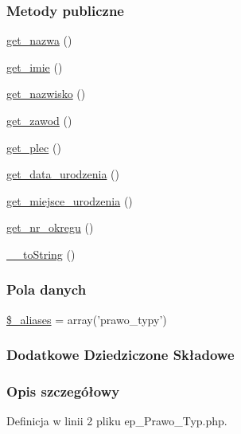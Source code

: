 \subsubsection*{Metody publiczne}
\begin{DoxyCompactItemize}
\item 
\hyperlink{classep___prawo___typ_ac0818f0049d7b84f08f77128f54cee36}{get\-\_\-nazwa} ()
\item 
\hyperlink{classep___prawo___typ_ac4b0c85dc2a130038f2d118dbd0c3d77}{get\-\_\-imie} ()
\item 
\hyperlink{classep___prawo___typ_abdd1d7ff92508da7f748ba1feec97af0}{get\-\_\-nazwisko} ()
\item 
\hyperlink{classep___prawo___typ_af80ca8310b60004454dd02a387deaa2c}{get\-\_\-zawod} ()
\item 
\hyperlink{classep___prawo___typ_ac7f9af5c3fa024e4c26a7b6bd4ce4bb4}{get\-\_\-plec} ()
\item 
\hyperlink{classep___prawo___typ_a880b240cd2d8c336fd1709bf0cb1ae2c}{get\-\_\-data\-\_\-urodzenia} ()
\item 
\hyperlink{classep___prawo___typ_ac57c08ec5e394a19c5bd9280c8376182}{get\-\_\-miejsce\-\_\-urodzenia} ()
\item 
\hyperlink{classep___prawo___typ_a2645a9f0aa5b0ccc482943348c033d0a}{get\-\_\-nr\-\_\-okregu} ()
\item 
\hyperlink{classep___prawo___typ_a7516ca30af0db3cdbf9a7739b48ce91d}{\-\_\-\-\_\-to\-String} ()
\end{DoxyCompactItemize}
\subsubsection*{Pola danych}
\begin{DoxyCompactItemize}
\item 
\hyperlink{classep___prawo___typ_ab4e31d75f0bc5d512456911e5d01366b}{\$\-\_\-aliases} = array('prawo\-\_\-typy')
\end{DoxyCompactItemize}
\subsubsection*{Dodatkowe Dziedziczone Składowe}


\subsubsection{Opis szczegółowy}


Definicja w linii 2 pliku ep\-\_\-\-Prawo\-\_\-\-Typ.\-php.



